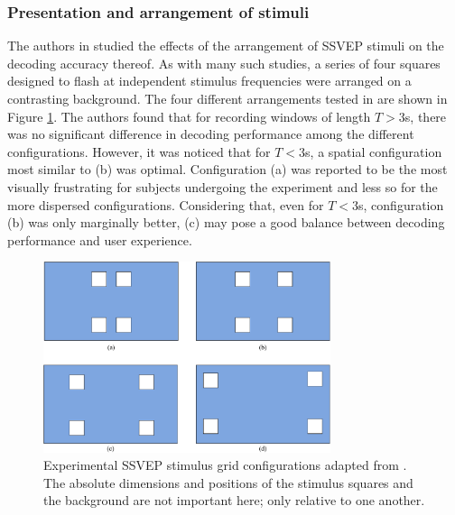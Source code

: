 \subsubsection{Presentation and arrangement of stimuli}
The authors in \cite{zhao-stimulus-layout-effect} studied the effects of the arrangement of SSVEP stimuli on the decoding accuracy thereof. As with many such studies, a series of four squares designed to flash at independent stimulus frequencies were arranged on a contrasting background. The four different arrangements tested in \cite{zhang-mset-cca} are shown in Figure \ref{fig:ssvep-grid-arrangements}. The authors found that for recording windows of length $T>3$s, there was no significant difference in decoding performance among the different configurations. However, it was noticed that for $T < 3$s, a spatial configuration most similar to (b) was optimal. Configuration (a) was reported to be the most visually frustrating for subjects undergoing the experiment and less so for the more dispersed configurations. Considering that, even for $T<3$s, configuration (b) was only marginally better, (c) may pose a good balance between decoding performance and user experience.

\begin{figure}[h]
    \centering
    \includegraphics[width=0.75\textwidth]{grid-arrangements}
    \caption[Experimental SSVEP stimulus grid configurations adapted from \cite{zhao-stimulus-layout-effect}]{Experimental SSVEP stimulus grid configurations adapted from \cite{zhao-stimulus-layout-effect}. The absolute dimensions and positions of the stimulus squares and the background are not important here; only relative to one another.}
    \label{fig:ssvep-grid-arrangements}
\end{figure}


